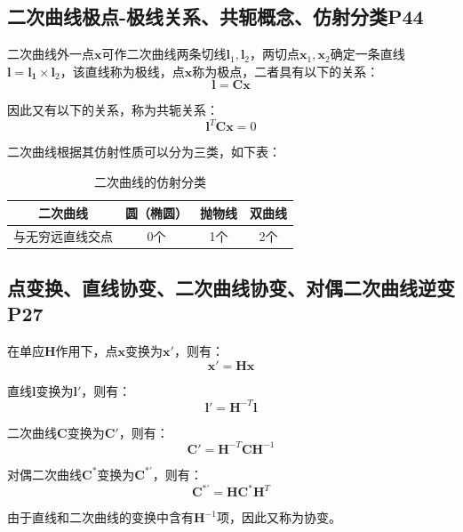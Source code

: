 \documentclass[11pt]{article}
\begin{document}
\subsection{二次曲线极点-极线关系、共轭概念、仿射分类P44}
二次曲线外一点$\mathbold{x}$可作二次曲线两条切线$\mathbold{l}_1,\mathbold{l}_2$，两切点$\mathbold{x}_1,\mathbold{x}_2$确定一条直线$\mathbold{l}=\mathbold{l_1}\times\mathbold{l}_2$，该直线称为极线，点$\mathbold{x}$称为极点，二者具有以下的关系：
\begin{equation*}
  \mathbold{l}=\mathbold{Cx}
\end{equation*}\par
因此又有以下的关系，称为共轭关系：
\begin{equation*}
  \mathbold{l}^T\mathbold{C}\mathbold{x}=0
\end{equation*}\par
二次曲线根据其仿射性质可以分为三类，如下表：
\begin{table}[H]
  \centering
  \caption{二次曲线的仿射分类}
  \begin{tabular}{|c|c|c|c|}
    \hline
    二次曲线     & 圆（椭圆） & 抛物线 & 双曲线 \\
    \hline
    与无穷远直线交点 & 0个    & 1个  & 2个  \\
    \hline
  \end{tabular}
\end{table}
\subsection{点变换、直线协变、二次曲线协变、对偶二次曲线逆变P27}
在单应$\mathbold{H}$作用下，点$\mathbold{x}$变换为$\mathbold{x}'$，则有：
\begin{equation*}
  \mathbold{x}'=\mathbold{Hx}
\end{equation*}\par
直线$\mathbold{l}$变换为$\mathbold{l}'$，则有：
\begin{equation*}
  \mathbold{l}'=\mathbold{H}^{-T}\mathbold{l}
\end{equation*}\par
二次曲线$\mathbold{C}$变换为$\mathbold{C}'$，则有：
\begin{equation*}
  \mathbold{C}'=\mathbold{H}^{-T}\mathbold{CH}^{-1}
\end{equation*}\par
对偶二次曲线$\mathbold{C}^*$变换为$\mathbold{C}^{*'}$，则有：
\begin{equation*}
  \mathbold{C}^{*'}=\mathbold{HC}^*\mathbold{H}^T
\end{equation*}\par
由于直线和二次曲线的变换中含有$\mathbold{H}^{-1}$项，因此又称为协变。
\end{document}
